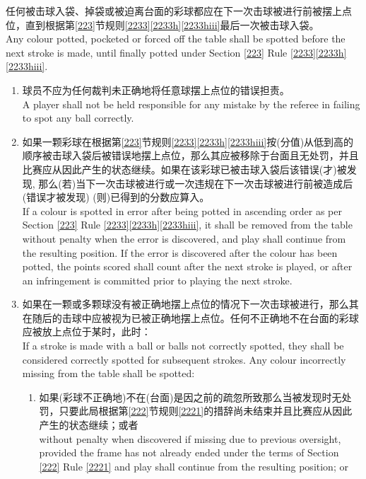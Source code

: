 \noindent 任何被击球入袋、掉袋或被迫离台面的彩球都应在下一次击球被进行前被摆上点位，直到根据第\ref{223}节规则\ref{2233}\ref{2233h}\ref{2233hiii}最后一次被击球入袋。\\
Any colour potted, pocketed or forced off the table shall be spotted before the next stroke is made, until finally potted under Section \ref{223} Rule \ref{2233}\ref{2233h}\ref{2233hiii}.
\begin{enumerate}[label=(\alph*)]
    \item 球员不应为任何裁判未正确地将任意球摆上点位的错误担责。\\
    A player shall not be held responsible for any mistake by the referee in failing to spot any ball correctly.
    \item 如果一颗彩球在根据第\ref{223}节规则\ref{2233}\ref{2233h}\ref{2233hiii}按(分值)从低到高的顺序被击球入袋后被错误地摆上点位，那么其应被移除于台面且无处罚，并且比赛应从因此产生的状态继续。如果在该彩球已被击球入袋后该错误(才)被发现, 那么(若)当下一次击球被进行或一次违规在下一次击球被进行前被造成后(错误才被发现) (则)已得到的分数应算入。\\
    If a colour is spotted in error after being potted in ascending order as per Section \ref{223} Rule \ref{2233}\ref{2233h}\ref{2233hiii}, it shall be removed from the table without penalty when the error is discovered, and play shall continue from the resulting position. If the error is discovered after the colour has been potted, the points scored shall count after the next stroke is played, or after an infringement is committed prior to playing the next stroke.
    \item \label{2237c}如果在一颗或多颗球没有被正确地摆上点位的情况下一次击球被进行，那么其在随后的击球中应被视为已被正确地摆上点位。任何不正确地不在台面的彩球应被放上点位于某时，此时：\\
    If a stroke is made with a ball or balls not correctly spotted, they shall be considered correctly spotted for subsequent strokes. Any colour incorrectly missing from the table shall be spotted:
    \begin{enumerate}[label=(\roman*)]
        \item 如果(彩球不正确地)不在(台面)是因之前的疏忽所致那么当被发现时无处罚，只要此局根据第\ref{222}节规则\ref{2221}的措辞尚未结束并且比赛应从因此产生的状态继续；或者\\
        without penalty when discovered if missing due to previous oversight, provided the frame has not already ended under the terms of Section \ref{222} Rule \ref{2221} and play shall continue from the resulting position; or

\end{enumerate}
\end{enumerate}
